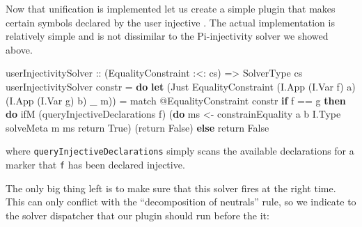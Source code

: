 \documentclass[
  sigconf,
  screen,
  review]{acmart}
\newenvironment{Shaded}{}{}
\newcommand{\DataTypeTok}[1]{\textcolor[rgb]{0.56,0.13,0.00}{#1}}
\newcommand{\FunctionTok}[1]{\textcolor[rgb]{0.02,0.16,0.49}{#1}}
\newcommand{\KeywordTok}[1]{\textcolor[rgb]{0.00,0.44,0.13}{\textbf{#1}}}
\newcommand{\NormalTok}[1]{#1}
\newcommand{\OperatorTok}[1]{\textcolor[rgb]{0.40,0.40,0.40}{#1}}
\newcommand{\OtherTok}[1]{\textcolor[rgb]{0.00,0.44,0.13}{#1}}
\newcommand{\StringTok}[1]{\textcolor[rgb]{0.25,0.44,0.63}{#1}}
\begin{document}
Now that unification is implemented let us create a simple plugin that
makes certain symbols declared by the user injective
\citep{agdausersInjectiveUnificationPragma2023}. The actual
implementation is relatively simple and is not dissimilar to the
Pi-injectivity solver we showed above.

\begin{Shaded}
\begin{Highlighting}[]
\OtherTok{userInjectivitySolver ::}\NormalTok{ (}\DataTypeTok{EqualityConstraint} \OperatorTok{:\textless{}:}\NormalTok{ cs)}
                      \OtherTok{=\textgreater{}} \DataTypeTok{SolverType}\NormalTok{ cs}
\NormalTok{userInjectivitySolver constr }\OtherTok{=} \KeywordTok{do}
  \KeywordTok{let}\NormalTok{ (}\DataTypeTok{Just} \DataTypeTok{EqualityConstraint}
\NormalTok{              (}\DataTypeTok{I.App}\NormalTok{ (}\DataTypeTok{I.Var}\NormalTok{ f) a)}
\NormalTok{              (}\DataTypeTok{I.App}\NormalTok{ (}\DataTypeTok{I.Var}\NormalTok{ g) b) \_ m)) }\OtherTok{=}
\NormalTok{        match }\OperatorTok{@}\DataTypeTok{EqualityConstraint}\NormalTok{ constr}
  \KeywordTok{if}\NormalTok{ f }\OperatorTok{==}\NormalTok{ g}
  \KeywordTok{then} \KeywordTok{do}
\NormalTok{    ifM (queryInjectiveDeclarations f)}
\NormalTok{        (}\KeywordTok{do}
\NormalTok{           ms }\OtherTok{\textless{}{-}}\NormalTok{ constrainEquality a b }\DataTypeTok{I.Type}
\NormalTok{           solveMeta m ms}
           \FunctionTok{return} \DataTypeTok{True}\NormalTok{)}
\NormalTok{        (}\FunctionTok{return} \DataTypeTok{False}\NormalTok{)}
  \KeywordTok{else} \FunctionTok{return} \DataTypeTok{False}
\end{Highlighting}
\end{Shaded}

where \texttt{queryInjectiveDeclarations} simply scans the available
declarations for a marker that \texttt{f} has been declared injective.

The only big thing left is to make sure that this solver fires at the
right time. This can only conflict with the ``decomposition of
neutrals'' rule, so we indicate to the solver dispatcher that our plugin
should run before the it:

\begin{Shaded}
\end{Shaded}
\end{document}
